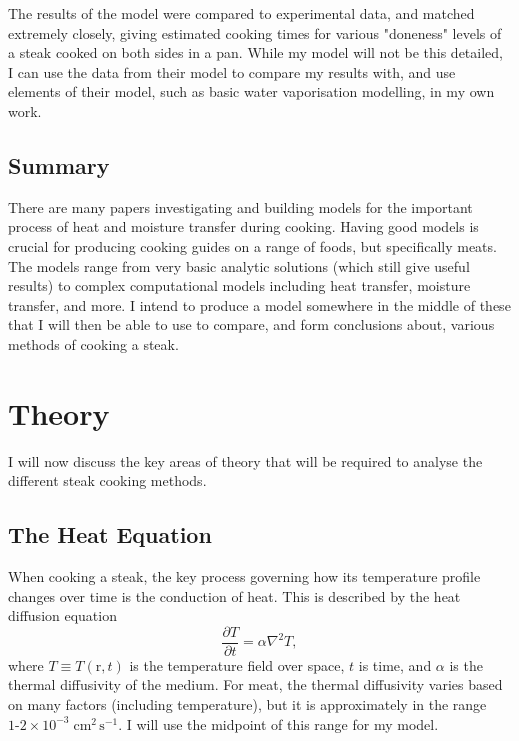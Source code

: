\documentclass[11pt]{article}
\newcommand{\bvec}[1]{\bm{\mathrm{#1}}}
\begin{document}
	The results of the model were compared to experimental data, and matched extremely closely, giving estimated cooking times for various "doneness" levels of a steak cooked on both sides in a pan. While my model will not be this detailed, I can use the data from their model to compare my results with, and use elements of their model, such as basic water vaporisation modelling, in my own work.
	
	\subsection{Summary}
	
	There are many papers investigating and building models for the important process of heat and moisture transfer during cooking. Having good models is crucial for producing cooking guides on a range of foods, but specifically meats. The models range from very basic analytic solutions (which still give useful results) to complex computational models including heat transfer, moisture transfer, and more. I intend to produce a model somewhere in the middle of these that I will then be able to use to compare, and form conclusions about, various methods of cooking a steak.
	
	\section{Theory}
	
	I will now discuss the key areas of theory that will be required to analyse the different steak cooking methods.
	
	\subsection{The Heat Equation}
	
	When cooking a steak, the key process governing how its temperature profile changes over time is the conduction of heat. This is described by the heat diffusion equation\cite{heat_equation}
	\begin{equation}
		\frac{\partial T}{\partial t} = \alpha \nabla^2 T,
	\end{equation}
	where $T \equiv T(\bvec{r}, t)$ is the temperature field over space, $t$ is time, and $\alpha$ is the thermal diffusivity of the medium. For meat, the thermal diffusivity varies based on many factors (including temperature), but it is approximately in the range $1\text{-}2 \times 10^{-3}\;\mathrm{cm}^2\,\mathrm{s}^{-1}$\cite{meat_diffusivity,meat_diffusivity2}. I will use the midpoint of this range for my model.\\
	
\end{document}
